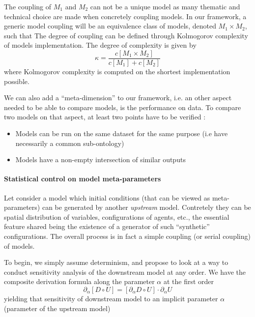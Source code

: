 The coupling of $M_1$ and $M_2$ can not be a unique model as many thematic and technical choice are made when concretely coupling models. In our framework, a generic model coupling will be an equivalence class of models, denoted $M_1 \times M_2$, such that 
The degree of coupling can be defined through Kolmogorov complexity of models implementation. The degree of complexity is given by
\[
\kappa = \frac{c[M_1 \times M_2]}{c[M_1] + c[M_2]}
\]
where Kolmogorov complexity is computed on the shortest implementation possible.


We can also add a ``meta-dimension'' to our framework, i.e. an other aspect needed to be able to compare models, is the performance on data. To compare two models on that aspect, at least two points have to be verified :
\begin{itemize}
\item Models can be run on the same dataset for the same purpose (i.e have necessarily a common sub-ontology)
\item Models have a non-empty intersection of similar outputs
\end{itemize}



\paragraph{Statistical control on model meta-parameters}

Let consider a model which initial conditions (that can be viewed as meta-parameters) can be generated by another \emph{upstream} model. Contretely they can be spatial distribution of variables, configurations of agents, etc., the essential feature shared being the existence of a generator of such ``synthetic'' configurations. The overall process is in fact a simple coupling (or serial coupling) of models.

To begin, we simply assume determinism, and propose to look at a way to conduct sensitivity analysis of the downstream model at any order. We have the composite derivation formula along the parameter $\alpha$ at the first order
\[
\partial_{\alpha}[D \circ U] = [\partial_{\alpha} D \circ U ]\cdot \partial_{\alpha} U
\]
yielding that sensitivity of downstream model to an implicit parameter $\alpha$ (parameter of the upstream model)


